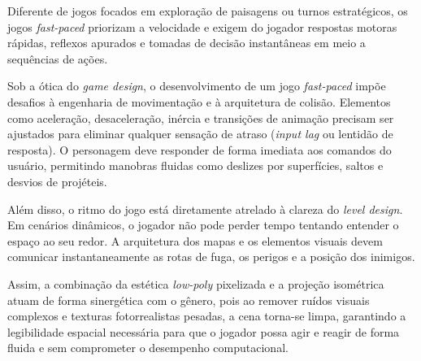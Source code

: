 Diferente de jogos focados em exploração de paisagens ou turnos estratégicos,
os jogos \textit{fast-paced} priorizam a velocidade e exigem do jogador respostas
motoras rápidas, reflexos apurados e tomadas de decisão instantâneas em meio a
sequências de ações.

Sob a ótica do \textit{game design}, o desenvolvimento de um jogo \textit{fast-paced} impõe
desafios à engenharia de movimentação e à arquitetura de colisão. Elementos como aceleração,
desaceleração, inércia e transições de animação precisam ser ajustados para eliminar qualquer
sensação de atraso (\textit{input lag} ou lentidão de resposta). O personagem deve responder
de forma imediata aos comandos do usuário, permitindo manobras fluidas como deslizes por
superfícies, saltos e desvios de projéteis.

Além disso, o ritmo do jogo está diretamente atrelado à clareza do \textit{level design}. Em cenários
dinâmicos, o jogador não pode perder tempo tentando entender o espaço ao seu redor. A arquitetura dos
mapas e os elementos visuais devem comunicar instantaneamente as rotas de fuga, os perigos e a posição
dos inimigos.

Assim, a combinação da estética \textit{low-poly} pixelizada e a projeção isométrica atuam de forma
sinergética com o gênero, pois ao remover ruídos visuais complexos e texturas fotorrealistas pesadas,
a cena torna-se limpa, garantindo a legibilidade espacial necessária para que o jogador possa agir e
reagir de forma fluida e sem comprometer o desempenho computacional.

